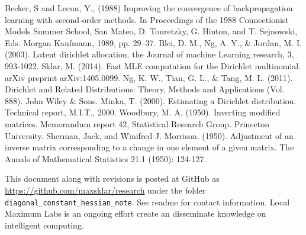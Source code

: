 \documentclass[twoside]{article}
\begin{document}

\begin{thebibliography}{20}
 Becker, S and Lecun, Y., (1988) Improving the convergence of backpropagation learning with second-order methods. In Proceedings of the 1988 Connectionist Models Summer School, San Mateo, D. Touretzky, G. Hinton, and T. Sejnowski, Eds. Morgan Kaufmann, 1989, pp. 29–37.
Blei, D. M., Ng, A. Y., \& Jordan, M. I. (2003). Latent dirichlet allocation. the Journal of machine Learning research, 3, 993-1022.
Sklar, M. (2014). Fast MLE computation for the Dirichlet multinomial. arXiv preprint arXiv:1405.0099.
Ng, K. W., Tian, G. L., \& Tang, M. L. (2011). Dirichlet and Related Distributions: Theory, Methods and Applications (Vol. 888). John Wiley \& Sons.
Minka, T. (2000). Estimating a Dirichlet distribution. Technical report, M.I.T., 2000.
Woodbury, M. A. (1950). Inverting modified matrices. Memorandum report 42, Statistical Research Group. Princeton University.
Sherman, Jack, and Winifred J. Morrison. (1950). Adjustment of an inverse matrix corresponding to a change in one element of a given matrix. The Annals of Mathematical Statistics 21.1 (1950): 124-127.

\end{thebibliography}

This document along with revisions is posted at GitHub as \url{https://github.com/maxsklar/research} under the folder \texttt{diagonal\_constant\_hessian\_note}. See readme for contact information. Local Maximum Labs is an ongoing effort create an disseminate knowledge on intelligent computing.
\end{document}
